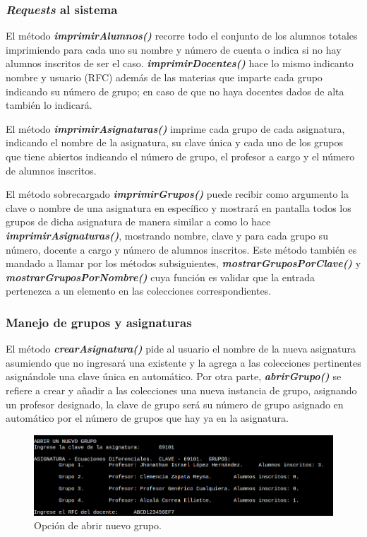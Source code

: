 \documentclass[a4paper,12pt]{article}
\begin{document}
\subsubsection{\textit{Requests} al sistema}

El método \textbf{\textit{imprimirAlumnos()}} recorre todo el conjunto de los alumnos totales imprimiendo para cada uno su nombre y número de cuenta o indica si no hay alumnos inscritos de ser el caso. \textbf{\textit{imprimirDocentes()}} hace lo mismo indicanto nombre y usuario (RFC) además de las materias que imparte cada grupo indicando su número de grupo; en caso de que no haya docentes dados de alta también lo indicará.

El método \textbf{\textit{imprimirAsignaturas()}} imprime cada grupo de cada asignatura, indicando el nombre de la asignatura, su clave única y cada uno de los grupos que tiene abiertos indicando el número de grupo, el profesor a cargo y el número de alumnos inscritos.

El método sobrecargado \textbf{\textit{imprimirGrupos()}} puede recibir como argumento la clave o nombre de una asignatura en específico y mostrará en pantalla todos los grupos de dicha asignatura de manera similar a como lo hace \textbf{\textit{imprimirAsignaturas()}}, mostrando nombre, clave y para cada grupo su número, docente a cargo y número de alumnos inscritos. Este método también es mandado a llamar por los métodos subsiguientes, \textbf{\textit{mostrarGruposPorClave()}} y \textbf{\textit{mostrarGruposPorNombre()}} cuya función es validar que la entrada pertenezca a un elemento en las colecciones correspondientes.

\subsubsection{Manejo de grupos y asignaturas}

El método \textbf{\textit{crearAsignatura()}} pide al usuario el nombre de la nueva asignatura asumiendo que no ingresará una existente y la agrega a las colecciones pertinentes asignándole una clave única en automático. Por otra parte, \textbf{\textit{abrirGrupo()}} se refiere a crear y añadir a las colecciones una nueva instancia de grupo, asignando un profesor designado, la clave de grupo será su número de grupo asignado en automático por el número de grupos que hay ya en la asignatura.

\begin{figure}[ht]
    \centering
    \includegraphics[width=.9\textwidth]{media/abrir_grupo.png}
    \caption{Opción de abrir nuevo grupo.}
    \label{fig:abrir_grupo}
\end{figure}
\end{document}
